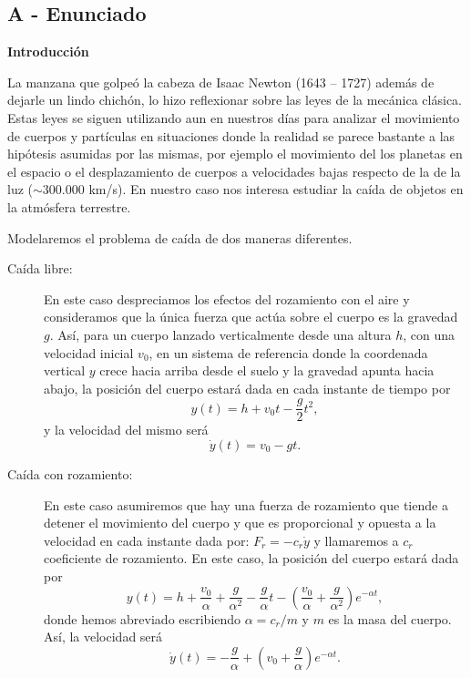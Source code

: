 \documentclass[a4paper]{article}
\begin{document}
\subsection{A - Enunciado}
{\bf Introducción}

La manzana que golpeó la cabeza de Isaac Newton (1643 -- 1727) además de dejarle un lindo chichón, lo hizo reflexionar sobre las leyes de la mecánica clásica. Estas leyes se siguen utilizando aun en nuestros días para analizar el movimiento de cuerpos y partículas en situaciones donde la realidad se parece bastante a las hipótesis asumidas por las mismas, por ejemplo el movimiento del los planetas en el espacio o el desplazamiento de cuerpos a velocidades bajas respecto de la de la luz ($\sim 300.000$ km/s). En nuestro caso nos interesa estudiar la caída de objetos en la atmósfera terrestre.

Modelaremos el problema de caída de dos maneras diferentes. 
\begin{description}
 \item[Caída libre:] En este caso despreciamos los efectos del rozamiento con el aire y consideramos que la única fuerza que actúa sobre el cuerpo es la gravedad $g$. Así, para un cuerpo lanzado verticalmente desde una altura $h$, con una velocidad inicial $v_0$, en un sistema de referencia donde la coordenada vertical $y$ crece hacia arriba desde el suelo y la gravedad apunta hacia abajo, la posición del cuerpo estará dada en cada instante de tiempo por
\begin{equation}
 y(t) = h + v_0 t - \frac{g}{2} t^2,
\end{equation}
y la velocidad del mismo será
\begin{equation}
 \dot{y}(t) = v_0 - g t.
\end{equation}
 \item[Caída con rozamiento: ] En este caso asumiremos que hay una fuerza de rozamiento que tiende a detener el movimiento del cuerpo y que es proporcional y opuesta a la velocidad en cada instante dada por: $F_r = - c_r \dot{y}$ y llamaremos a $c_r$ coeficiente de rozamiento. En este caso, la posición del cuerpo estará dada por
\begin{equation}
 y(t) = h + \frac{v_0}{\alpha} + \frac{g}{\alpha^2} - \frac{g}{\alpha} t -\left( \frac{v_0}{\alpha} + \frac{g}{\alpha^2} \right) e^{-\alpha t},
\end{equation}
donde hemos abreviado escribiendo $\alpha = c_r / m$ y $m$ es la masa del cuerpo. Así, la velocidad será 
\begin{equation}
 \dot{y}(t) = - \frac{g}{\alpha} +\left( v_0 + \frac{g}{\alpha} \right) e^{-\alpha t}.
\end{equation}
\end{description}
\end{document}
